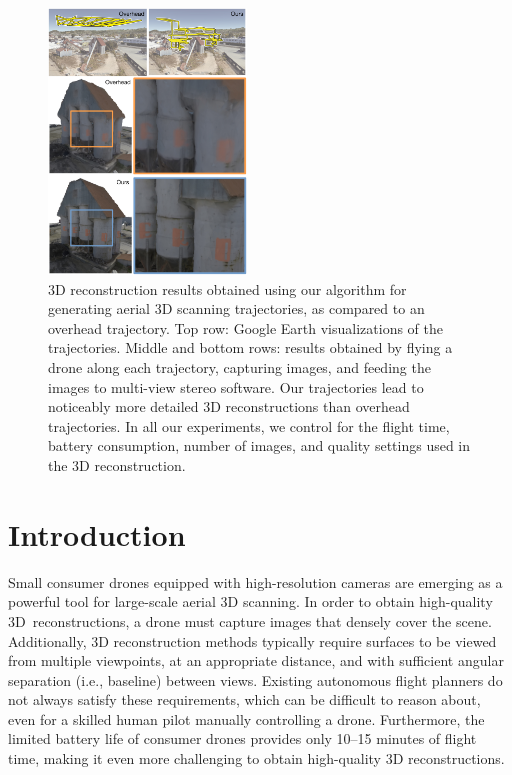 \begin{figure}[t]
\begin{center}
\includegraphics[width=0.47\textwidth]{images/2017_iccv/teaser.jpg}{\vspace{-7pt}}
\end{center}
\caption{
3D reconstruction results obtained using our algorithm for generating aerial 3D scanning trajectories, as compared to an overhead trajectory.
Top row: Google Earth visualizations of the trajectories.
Middle and bottom rows: results obtained by flying a drone along each trajectory, capturing images, and feeding the images to multi-view stereo software.
Our trajectories lead to noticeably more detailed 3D reconstructions than overhead trajectories.
In all our experiments, we control for the flight time, battery consumption, number of images, and quality settings used in the 3D reconstruction.
}
\vspace{-13pt}
\label{fig:teaser}
\end{figure}

\vspace{-16pt}
\section{Introduction}

Small consumer drones equipped with high-resolution cameras are emerging as a powerful tool for large-scale aerial 3D scanning.
In order to obtain high-quality 3D\ reconstructions, a drone must capture images that densely cover the scene.
Additionally, 3D reconstruction methods typically require surfaces to be viewed from multiple viewpoints, at an appropriate distance, and with sufficient angular separation (i.e., baseline) between views.
Existing autonomous flight planners do not always satisfy these  requirements, which can be difficult to reason about, even for a skilled human pilot manually controlling a drone.
Furthermore, the limited battery life of consumer drones provides only 10--15 minutes of flight time, making it even more challenging to obtain high-quality 3D reconstructions.

